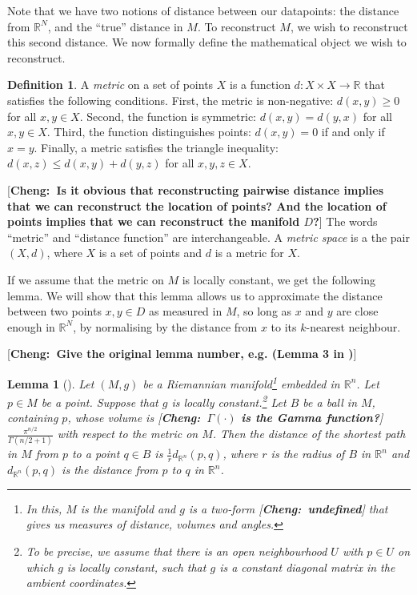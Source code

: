 \documentclass[a4paper,11pt,leqno]{article} \usepackage{amsmath}
\newcommand{\RR}{\mathbb{R}} \newcommand{\QQ}{\mathbb{Q}}
\newtheorem*{lemma}{Lemma}
\theoremstyle{definition}
\newtheorem{defn}{Definition}
\newcommand{\cheng}[1]{ {\color{purple}[{\bf Cheng:~{#1}}]} }
\begin{document}
Note that we have two notions of distance between our datapoints: the distance
from $\RR^N$, and the ``true'' distance in $M$.
To reconstruct $M$, we wish to reconstruct this second distance.
We now formally define the mathematical object we wish to reconstruct.

\begin{defn}
  A \emph{metric} on a set of points $X$ is a function $d: X\times X\to \RR$
  that satisfies the following conditions.
  First, the metric is non-negative: $d(x, y) \geq 0$ for all $x, y\in X$.
  Second, the function is symmetric: $d(x, y) = d(y, x)$ for all $x, y\in X$.
  Third, the function distinguishes points: $d(x, y) = 0$ if and only if $x
  = y$.
  Finally, a metric satisfies the triangle inequality: $d(x, z)\leq d(x, y)
  + d(y, z)$ for all $x,y,z\in X$.
\end{defn}

\cheng{Is it obvious that reconstructing pairwise distance implies that we can reconstruct
the location of points? And the location of points implies that we can reconstruct the manifold $D$?}
The words ``metric'' and ``distance function'' are interchangeable.
A \emph{metric space} is a the pair $(X, d)$, where $X$ is a set of points and
$d$ is a metric for $X$.

If we assume that the metric on $M$ is locally constant, we get the following
lemma.
We will show that this lemma allows us to approximate the distance between two
points $x, y\in D$ as measured in $M$, so long as $x$ and $y$ are close enough
in $\RR^N$, by normalising by the distance from $x$ to its $k$-nearest
neighbour.

\cheng{Give the original lemma number, e.g. (Lemma 3 in  \cite{McInnes18})}
\begin{lemma}[\cite{McInnes18}]
  Let $(M, g)$ be a Riemannian manifold\footnote{
    In this, $M$ is the manifold and $g$ is a two-form \cheng{undefined} that gives us measures of
    distance, volumes and angles.
  } embedded in $\RR^n$.
  Let $p\in M$ be a point.
  Suppose that $g$ is locally constant.\footnote{
    To be precise, we assume that there is an open neighbourhood $U$ with
    $p\in U$ on which $g$ is locally constant, such that $g$ is a constant
    diagonal matrix in the ambient coordinates.
  }
  Let $B$ be a ball in $M$, containing $p$, whose volume is
  \cheng{$\Gamma(\cdot)$ is the Gamma function?}
  $\frac{\pi^{n/2}}{\Gamma(n/2+1)}$ with respect to the metric on $M$.
  Then the distance of the shortest path in $M$ from $p$ to a point $q\in B$ is
  $\frac{1}{r}d_{\RR^n}(p, q)$, where $r$ is the radius of $B$ in $\RR^n$ and
  $d_{\RR^n}(p, q)$ is the distance from $p$ to $q$ in $\RR^n$.
\end{lemma}
\end{document}
